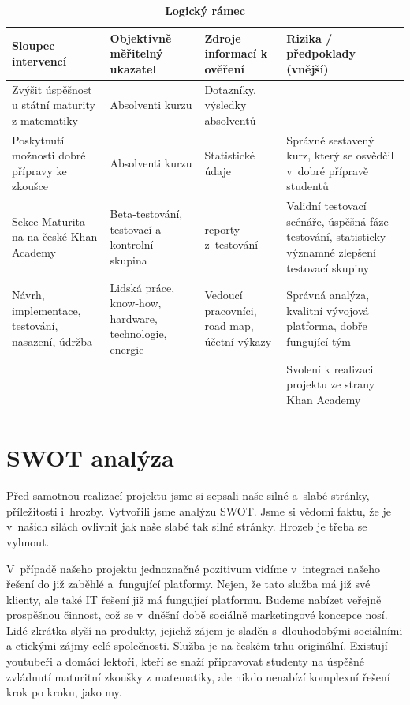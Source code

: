 \documentclass[12pt, a4paper]{report}
\begin{document}
\begin{table}[htbp]
\caption{\textbf{Logický rámec}}
\centering
\footnotesize
\begin{tabularx}{\textwidth}{|X|X|X|X|}
\hline
Sloupec intervencí & Objektivně měřitelný ukazatel & Zdroje informací k ověření & Rizika / předpoklady (vnější)\\
\hline
Zvýšit úspěšnost u státní maturity z matematiky & Absolventi kurzu & Dotazníky, výsledky absolventů & \\
\hline
Poskytnutí možnosti dobré přípravy ke zkoušce & Absolventi kurzu & Statistické údaje & Správně sestavený kurz, který se osvědčil v dobré přípravě studentů\\
\hline
Sekce Maturita na na české Khan Academy & Beta-testování, testovací a  kontrolní skupina & reporty z testování & Validní testovací scénáře, úspěšná fáze testování, statisticky významné zlepšení testovací skupiny\\
\hline
Návrh, implementace, testování, nasazení, údržba & Lidská práce, know-how, hardware, technologie, energie & Vedoucí pracovníci, road map, účetní výkazy & Správná analýza, kvalitní vývojová platforma, dobře fungující tým\\
\hline
 &  &  & Svolení k realizaci projektu ze strany Khan Academy\\
\hline
\end{tabularx}
\end{table}

\chapter{SWOT analýza}
\label{sec:org7b81b8a}
Před samotnou realizací projektu jsme si sepsali naše silné a slabé stránky,
příležitosti i hrozby. Vytvořili jsme analýzu SWOT. Jsme si vědomi faktu, že je
v našich silách ovlivnit jak naše slabé tak silné stránky. Hrozeb je třeba se
vyhnout.

V případě našeho projektu jednoznačné pozitivum vidíme v integraci našeho řešení
do již zaběhlé a fungující platformy. Nejen, že tato služba má již své klienty,
ale také IT řešení již má fungující platformu. Budeme nabízet veřejně prospěšnou
činnost, což se v dněšní době sociálně marketingové koncepce nosí. Lidé zkrátka
slyší na produkty, jejichž zájem je sladěn s dlouho\-dobými sociálními a
etickými zájmy celé společnosti. Služba je na českém trhu originální. Existují
youtubeři a domácí lektoři, kteří se snaží připravovat studenty na úspěšné
zvládnutí maturitní zkoušky z matematiky, ale nikdo nenabízí komplexní řešení
krok po kroku, jako my.
\end{document}
